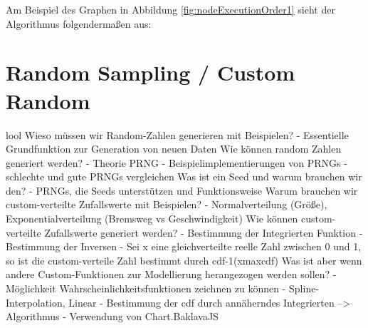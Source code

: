 Am Beispiel des Graphen in Abbildung \ref{fig:nodeExecutionOrder1} sieht der Algorithmus folgendermaßen aus:

\todo

\section{Random Sampling / Custom Random}
lool
Wieso müssen wir Random-Zahlen generieren mit Beispielen?
- Essentielle Grundfunktion zur Generation von neuen Daten 
Wie können random Zahlen generiert werden? 
- Theorie PRNG
- Beispielimplementierungen von PRNGs
- schlechte und gute PRNGs vergleichen
Was ist ein Seed und warum brauchen wir den?
- PRNGs, die Seeds unterstützen und Funktionsweise
Warum brauchen wir custom-verteilte Zufallswerte mit Beispielen?
- Normalverteilung (Größe), Exponentialverteilung (Bremsweg vs Geschwindigkeit)
Wie können custom-verteilte Zufallswerte generiert werden?
- Bestimmung der Integrierten Funktion
- Bestimmung der Inversen
- Sei x eine gleichverteilte reelle Zahl zwischen 0 und 1, so ist die custom-verteile Zahl bestimmt durch cdf-1(xmaxcdf)
Was ist aber wenn andere Custom-Funktionen zur Modellierung herangezogen werden sollen?
- Möglichkeit Wahrscheinlichkeitsfunktionen zeichnen zu können
- Spline-Interpolation, Linear
- Bestimmung der cdf durch annäherndes Integrierten --> Algorithmus
- Verwendung von Chart.BaklavaJS

